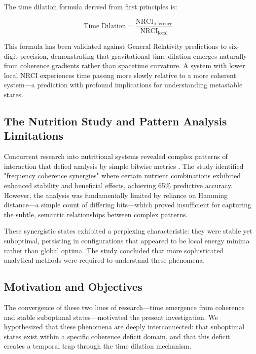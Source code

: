 \documentclass[12pt, a4paper]{article}
\begin{document}
The time dilation formula derived from first principles is:

\begin{equation}
\text{Time Dilation} = \frac{\text{NRCI}_{\text{reference}}}{\text{NRCI}_{\text{local}}}
\label{eq:time_dilation}
\end{equation}

This formula has been validated against General Relativity predictions to six-digit precision, demonstrating that gravitational time dilation emerges naturally from coherence gradients rather than spacetime curvature. A system with lower local NRCI experiences time passing more slowly relative to a more coherent system—a prediction with profound implications for understanding metastable states.

\subsection{The Nutrition Study and Pattern Analysis Limitations}

Concurrent research into nutritional systems revealed complex patterns of interaction that defied analysis by simple bitwise metrics \cite{nutrition_study}. The study identified "frequency coherence synergies" where certain nutrient combinations exhibited enhanced stability and beneficial effects, achieving 65\% predictive accuracy. However, the analysis was fundamentally limited by reliance on Hamming distance—a simple count of differing bits—which proved insufficient for capturing the subtle, semantic relationships between complex patterns.

These synergistic states exhibited a perplexing characteristic: they were stable yet suboptimal, persisting in configurations that appeared to be local energy minima rather than global optima. The study concluded that more sophisticated analytical methods were required to understand these phenomena.

\subsection{Motivation and Objectives}

The convergence of these two lines of research—time emergence from coherence and stable suboptimal states—motivated the present investigation. We hypothesized that these phenomena are deeply interconnected: that suboptimal states exist within a specific coherence deficit domain, and that this deficit creates a temporal trap through the time dilation mechanism.
\end{document}
